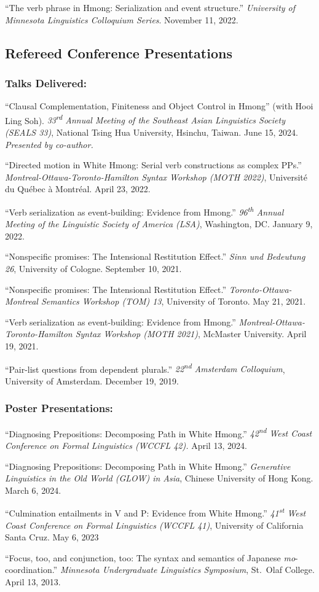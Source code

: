 \documentclass[11pt,oneside,DIV=calc,parskip=off]{scrarticle} %
\newlength{\spacingbefore}
\newlength{\spacingafter}
\newcommand{\myonecol}[1]{%
	\vspace{\spacingbefore}%
	\begin{minipage}[t]{\linewidth}%
		\strut#1%
	\end{minipage}%
	\vspace{\spacingafter}\par%
	}
\newcommand{\talk}[1]{%
	\myonecol{#1}%
	}
\begin{document}
\talk{``The verb phrase in Hmong: Serialization and event structure.'' \textit{University of Minnesota Linguistics Colloquium Series}. November 11, 2022.}


\subsection{Refereed Conference Presentations}
\subsubsection{Talks Delivered:}
\talk{``Clausal Complementation, Finiteness and Object Control in Hmong'' (with Hooi Ling Soh). \textit{33\textsuperscript{rd} Annual Meeting of the Southeast Asian Linguistics Society (SEALS 33)}, National Tsing Hua University, Hsinchu, Taiwan. June 15, 2024. \emph{Presented by co-author.}}
\talk{``Directed motion in White Hmong: Serial verb constructions as complex PPs.'' \textit{Montreal-Ottawa-Toronto-Hamilton Syntax Workshop (MOTH 2022)}, Universit\'e du Qu\'ebec \`a Montr\'eal. April 23, 2022.}
\talk{``Verb serialization as event-building: Evidence from Hmong.'' \textit{96\textsuperscript{th} Annual Meeting of the Linguistic Society of America (LSA)}, Washington, DC. January 9, 2022.}
\talk{``Nonspecific promises: The Intensional Restitution Effect.'' \textit{Sinn und Bedeutung 26}, University of Cologne. September 10, 2021.}
\talk{``Nonspecific promises: The Intensional Restitution Effect.'' \textit{Toronto-Ottawa-Montreal Semantics Workshop (TOM) 13}, University of Toronto. May 21, 2021.}
\talk{``Verb serialization as event-building: Evidence from Hmong.'' \textit{Montreal-Ottawa-Toronto-Hamilton Syntax Workshop (MOTH 2021)}, McMaster University. April 19, 2021.}
\talk{``Pair-list questions from dependent plurals.'' \textit{22\textsuperscript{nd} Amsterdam Colloquium}, University of Amsterdam. December 19, 2019.}

\subsubsection{Poster Presentations:}
\talk{``Diagnosing Prepositions: Decomposing Path in White Hmong.'' \textit{42\textsuperscript{nd} West Coast Conference on Formal Linguistics (WCCFL 42).} April 13, 2024.}
\talk{``Diagnosing Prepositions: Decomposing Path in White Hmong.'' \textit{Generative Linguistics in the Old World (GLOW) in Asia}, Chinese University of Hong Kong. March 6, 2024.}
\talk{``Culmination entailments in V and P: Evidence from White Hmong.'' \textit{41\textsuperscript{st} West Coast Conference on Formal Linguistics (WCCFL 41)}, University of California Santa Cruz. May 6, 2023}
\talk{``Focus, too, and conjunction, too: The syntax and semantics of Japanese \textit{mo}-coordination.'' \textit{Minnesota Undergraduate Linguistics Symposium}, St.\ Olaf College. April 13, 2013.}
\end{document}
